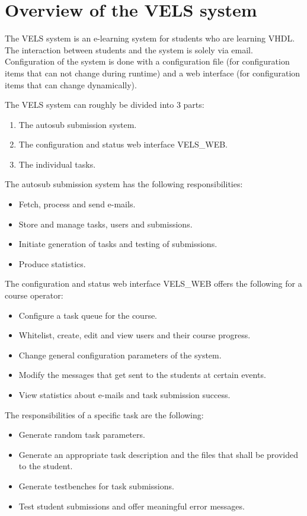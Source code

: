 \section{Overview of the VELS system} \label{velsoverview}
The VELS system is an e-learning system for students who are learning VHDL. The
interaction between students and the system is solely via email. Configuration of the
system is done with a configuration file (for configuration items that can not change
during runtime) and a web interface (for configuration items that can change dynamically).

The VELS system can roughly be divided into 3 parts:
\begin{enumerate}
    \item The autosub submission system.
    \item The configuration and status web interface VELS\_WEB.
    \item The individual tasks.
\end{enumerate}

The autosub submission system has the following responsibilities:
\begin{itemize}
    \item Fetch, process and send e-mails.
    \item Store and manage tasks, users and submissions.
    \item Initiate generation of tasks and testing of submissions.
    \item Produce statistics.
\end{itemize}

The configuration and status web interface VELS\_WEB offers the following for a course
operator:
\begin{itemize}
    \item Configure a task queue for the course.
    \item Whitelist, create, edit and view users and their course progress.
    \item Change general configuration parameters of the system.
    \item Modify the messages that get sent to the students at certain events.
    \item View statistics about e-mails and task submission success.
\end{itemize}

The responsibilities of a specific task are the following:
\begin{itemize}
    \item Generate random task parameters.
    \item Generate an appropriate task description and the files that shall
        be provided to the student.
    \item Generate testbenches for task submissions.
    \item Test student submissions and offer meaningful error messages.
\end{itemize}

